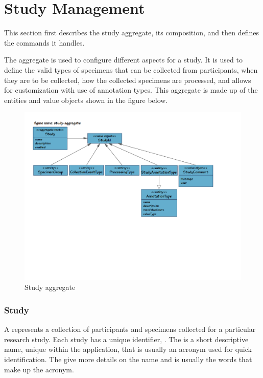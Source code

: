 \chapter{Study Management}
\label{chap:study-management}

This section first describes the study aggregate, its composition, and then
defines the commands it handles.

The  aggregate is used to configure different aspects for a
study. It is used to define the valid types of specimens that can be collected
from participants, when they are to be collected, how the collected specimens
are processed, and allows for customization with use of annotation types. This
aggregate is made up of the entities and value objects shown in the figure
below.

\begin{figure}[H]
  \centering
  \includegraphics[trim={9mm 76mm 36mm 18mm}, clip,
    width=1\textwidth]{images/study-aggregate}
  \caption{Study aggregate}
  \label{fig:study-aggregate}
\end{figure}

\subsection*{Study}

A  represents a collection of participants and specimens
collected for a particular research study. Each study has a unique identifier,
. The  is a short descriptive name, unique
within the application, that is usually an acronym used for quick
identification.  The  give more details on the name and
is usually the words that make up the acronym.

